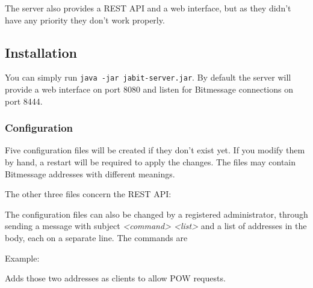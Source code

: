 \documentclass{bfh}
\begin{document}
  The server also provides a \acs{REST} \ac{API} and a web interface, but as they didn't have any priority they don't work properly.

  \subsection{Installation}
  You can simply run \texttt{java -jar jabit-server.jar}. By default the server will provide a web interface on port 8080 and listen for Bitmessage connections on port 8444.

  \subsubsection{Configuration}
  Five configuration files will be created if they don't exist yet. If you modify them by hand, a restart will be required to apply the changes. The files may contain Bitmessage addresses with different meanings.


  \vspace{5mm}
  The other three files concern the \acs{REST} \ac{API}:


  \vspace{5mm}
  The configuration files can also be changed by a registered administrator, through sending a message with subject \textit{<command> <list>} and a list of addresses in the body, each on a separate line. The commands are


  \vspace{5mm}
  Example:

  \vspace{5mm}
  Adds those two addresses as clients to allow \ac{POW} requests.
\end{document}
